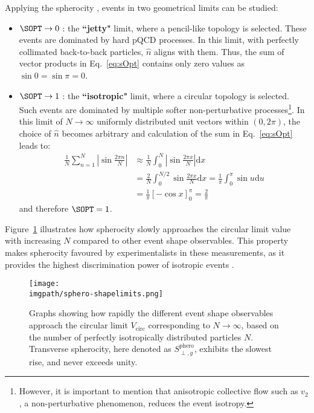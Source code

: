 Applying the spherocity \SOPT, events in two geometrical limits can be studied:
\begin{itemize}
\item $\SOPT \rightarrow 0$ : the \textbf{``jetty"} limit, where a pencil-like topology is selected. These events are dominated by hard pQCD processes. In this limit, with perfectly collimated back-to-back particles, $\hat{n}$ aligns with them. Thus, the sum of vector products in Eq.~\ref{eq:sOpt} contains only zero values as $\sin 0 = \sin \pi = 0$.
\item $\SOPT \rightarrow 1$ : the \textbf{``isotropic"} limit, where a circular topology is selected. Such events are dominated by multiple softer non-perturbative processes\footnote{However, it is important to mention that  anisotropic collective flow such as $v_2$, a non-perturbative phenomenon, reduces the event isotropy.}. In this limit of $N\rightarrow\infty$ uniformly distributed unit vectors within $(0,2\pi)$, the choice of $\hat{n}$ becomes arbitrary and calculation of the sum in Eq.~\ref{eq:sOpt} leads to:
 \begin{align}
\frac{1}{N} \sum_{n=1}^N | \sin\frac{2\pi n}{N}| &\approx \frac{1}{N} \int_0^N |\sin\frac{2\pi x}{N}| \mathrm{d}x \\ 
&= \frac{2}{N} \int_0^{N/2} \sin\frac{2\pi x}{N} \mathrm{d}x = \frac{1}{\pi} \int_0^{\pi} \sin u \mathrm{d}u \\
&= \frac{1}{\pi} \left[-\cos x\right]_0^{\pi} = \frac{2}{\pi} \quad \,
\end{align}
and therefore $\SOPT=1$. 
\end{itemize}

Figure~\ref{fig:sphero:shapelimits} illustrates how spherocity slowly approaches the circular limit value with increasing $N$ compared to other event shape observables. This property makes spherocity favoured by experimentalists in these measurements, as it provides the highest discrimination power of isotropic events \cite{ortizExperimentalResultsEvent2018}.

\begin{figure}%
\texttt{[image: \\imgpath/sphero-shapelimits.png]}
\caption{Graphs showing how rapidly the different event shape observables approach the circular limit $V_\mathrm{circ}$ corresponding to $N\to\infty$, based on the number of perfectly isotropically distributed particles $N$. Transverse spherocity, here denoted as $S^\mathrm{phero}_{\perp,g}$, exhibits the slowest rise, and never exceeds unity.\cite{banfiPhenomenologyEventShapes2010}}
\label{fig:sphero:shapelimits}
\end{figure}


